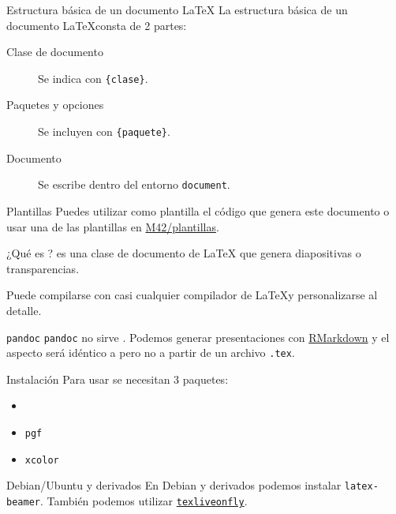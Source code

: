 \begin{frame}{Estructura básica de un documento \LaTeX}
  La estructura básica de un documento \LaTeX consta de 2 partes:
  \espacio
  \begin{description}
    \item[Clase de documento] Se indica con \texttt{\{clase\}}.
    \item[Paquetes y opciones] Se incluyen con \texttt{\{paquete\}}.
    \item[Documento] Se escribe dentro del entorno \texttt{document}.
  \end{description}
  \pause
  \espacio
  \begin{exampleblock}{Plantillas}
    Puedes utilizar como plantilla el código que genera este documento o usar
    una de las plantillas en
    \href{https://github.com/M42/plantillas/tree/master/presentacion}{M42/plantillas}.
  \end{exampleblock}
\end{frame}

\begin{frame}{¿Qué es \beamer?}
  \hypertarget<1>{beamer}{}
  \href{https://www.ctan.org/pkg/beamer}{\beamer} es una clase de documento de \LaTeX
  que genera diapositivas o transparencias.

  Puede compilarse con casi cualquier compilador de \LaTeX y personalizarse al detalle.

  \pause
  \espacio

  \begin{block}{\texttt{pandoc}}
    \texttt{pandoc} no sirve \frownie{}. Podemos generar presentaciones con
     \href{http://johnmacfarlane.net/pandoc/demo/example9/producing-slide-shows-with-pandoc}{
     RMarkdown} y el aspecto será idéntico a \beamer pero no a partir de un archivo
     \texttt{.tex}.
  \end{block}
\end{frame}

\begin{frame}{Instalación}
  Para usar \beamer se necesitan 3 paquetes:

  \begin{itemize}
    \item \beamer
    \item \texttt{pgf}
    \item \texttt{xcolor}
  \end{itemize}

  \pause
  \espacio

  \begin{block}{Debian/Ubuntu y derivados}
    En Debian y derivados podemos instalar \texttt{latex-beamer}. También podemos
    utilizar \href{http://www.ctan.org/pkg/texliveonfly}{\texttt{texliveonfly}}.
  \end{block}
\end{frame}

